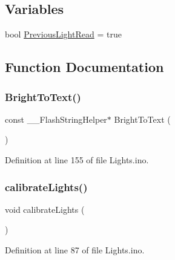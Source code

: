 \subsection*{Variables}
\begin{DoxyCompactItemize}
\item 
bool \mbox{\hyperlink{_lights_8ino_ab1435d46807c63ec7b7e0b1b3f1d3ba0}{Previous\+Light\+Read}} = true
\end{DoxyCompactItemize}


\subsection{Function Documentation}
\mbox{\label{_lights_8ino_adbfc7454808549ff8d9be0ac5e1e004a}} 
\subsubsection{\texorpdfstring{BrightToText()}{BrightToText()}}
{\footnotesize\ttfamily const \+\_\+\+\_\+\+Flash\+String\+Helper$\ast$ Bright\+To\+Text (\begin{DoxyParamCaption}{ }\end{DoxyParamCaption})}



Definition at line 155 of file Lights.\+ino.

\mbox{\label{_lights_8ino_aa2d3f5af576920b8e8db627d2649f5ac}} 
\subsubsection{\texorpdfstring{calibrateLights()}{calibrateLights()}}
{\footnotesize\ttfamily void calibrate\+Lights (\begin{DoxyParamCaption}{ }\end{DoxyParamCaption})}



Definition at line 87 of file Lights.\+ino.

\mbox{\label{_lights_8ino_af28e0ef82a157e0bc303dac9c1232f57}} 
